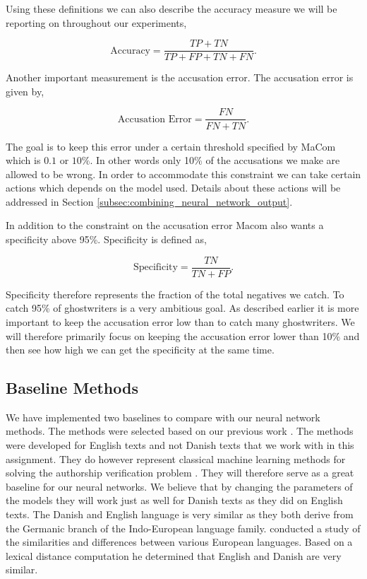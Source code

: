 Using these definitions we can also describe the accuracy measure we will be
reporting on throughout our experiments,

\begin{equation}
    \text{Accuracy} = \frac{TP + TN}{TP + FP + TN + FN}.
\end{equation}

Another important measurement is the accusation error. The accusation error is
given by,

\begin{equation}
    \text{Accusation Error} = \frac{FN}{FN + TN}.
\end{equation}

The goal is to keep this error under a certain threshold specified by MaCom
which is $0.1$ or $10\%$. In other words only 10\% of the accusations we make
are allowed to be wrong. In order to accommodate this constraint we can take
certain actions which depends on the model used. Details about these actions
will be addressed in Section \ref{subsec:combining_neural_network_output}.

In addition to the constraint on the accusation error Macom also wants a
specificity above 95\%. Specificity is defined as,

\begin{equation}
    \text{Specificity} = \frac{TN}{TN + FP}.
\end{equation}

Specificity therefore represents the fraction of the total negatives we catch.
To catch 95\% of ghostwriters is a very ambitious goal. As described earlier
it is more important to keep the accusation error low than to catch many
ghostwriters. We will therefore primarily focus on keeping the accusation error
lower than 10\% and then see how high we can get the specificity at the same
time.

\subsection{Baseline Methods}

We have implemented two baselines to compare with our neural network methods.
The methods were selected based on our previous work \citep{US}. The methods
were developed for English texts and not Danish texts that we work with in
this assignment. They do however represent classical machine learning methods
for solving the authorship verification problem \citep{stamatos2009}. They
will therefore serve as a great baseline for our neural networks. We believe
that by changing the parameters of the models they will work just as well for
Danish texts as they did on English texts. The Danish and English language is
very similar as they both derive from the Germanic branch of the Indo-European
language family. \citet{konstantin:2000} conducted a study of the similarities
and differences between various European languages. Based on a lexical distance
computation he determined that English and Danish are very similar.

